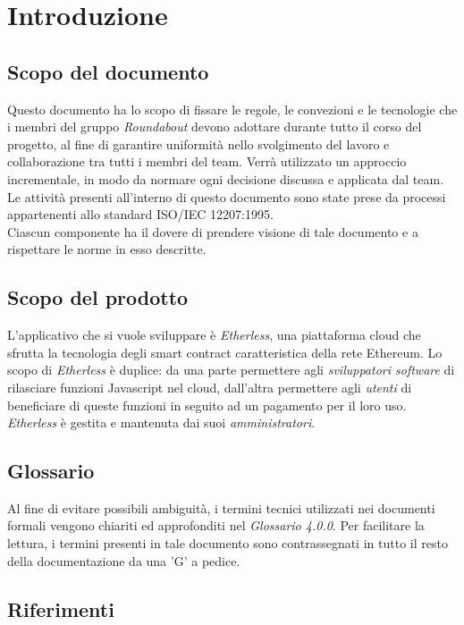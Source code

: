 \section{Introduzione}

\subsection{Scopo del documento}
Questo documento ha lo scopo di fissare le regole, le convezioni e le tecnologie che i membri del gruppo \textit{Roundabout} devono adottare durante tutto il corso del progetto, al fine di garantire uniformità nello svolgimento del lavoro e collaborazione tra tutti i membri del team. 
Verrà utilizzato un approccio incrementale, in modo da normare ogni decisione discussa
e applicata dal team. Le attività presenti all'interno di questo documento sono state prese da processi appartenenti allo standard ISO/IEC 12207:1995. \\
Ciascun componente ha il dovere di prendere visione di tale documento e a rispettare le norme in esso descritte.

\subsection{Scopo del prodotto}
L'applicativo che si vuole sviluppare è \textit{Etherless}, una piattaforma cloud che sfrutta la tecnologia degli smart contract caratteristica della rete Ethereum. Lo scopo di \textit{Etherless} è duplice: da una parte permettere agli \textit{sviluppatori software} di rilasciare funzioni Javascript nel cloud, dall'altra permettere agli \textit{utenti} di beneficiare di queste funzioni in seguito ad un pagamento per il loro uso. 
\textit{Etherless} è gestita e mantenuta dai suoi \textit{amministratori}.

\subsection{Glossario}
Al fine di evitare possibili ambiguità, i termini tecnici utilizzati nei documenti formali vengono chiariti ed approfonditi nel \textit{Glossario 4.0.0}. Per facilitare la lettura, i termini presenti in tale documento sono contrassegnati in tutto il resto della documentazione da una 'G' a pedice.

\subsection{Riferimenti}

